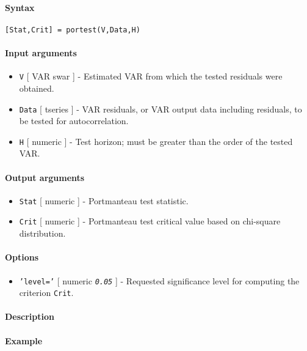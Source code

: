 


	\paragraph{Syntax}\label{syntax}

\begin{verbatim}
[Stat,Crit] = portest(V,Data,H)
\end{verbatim}

\paragraph{Input arguments}\label{input-arguments}

\begin{itemize}
\item
  \texttt{V} {[} VAR \textbar{} swar {]} - Estimated VAR from which the
  tested residuals were obtained.
\item
  \texttt{Data} {[} tseries {]} - VAR residuals, or VAR output data
  including residuals, to be tested for autocorrelation.
\item
  \texttt{H} {[} numeric {]} - Test horizon; must be greater than the
  order of the tested VAR.
\end{itemize}

\paragraph{Output arguments}\label{output-arguments}

\begin{itemize}
\item
  \texttt{Stat} {[} numeric {]} - Portmanteau test statistic.
\item
  \texttt{Crit} {[} numeric {]} - Portmanteau test critical value based
  on chi-square distribution.
\end{itemize}

\paragraph{Options}\label{options}

\begin{itemize}
\itemsep1pt\parskip0pt
\item
  \texttt{'level='} {[} numeric \textbar{} \emph{\texttt{0.05}} {]} -
  Requested significance level for computing the criterion
  \texttt{Crit}.
\end{itemize}

\paragraph{Description}\label{description}

\paragraph{Example}\label{example}


